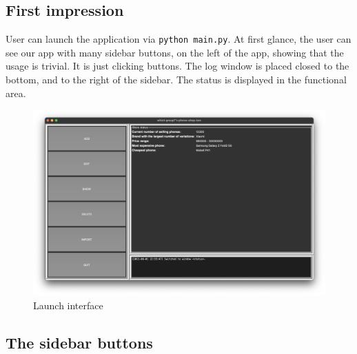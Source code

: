 \documentclass[12pt,oneside,a4paper]{article}
\begin{document}
\subsection{First impression}
User can launch the application via \verb|python main.py|. At first glance, the user can see our app with many sidebar buttons, on the left of the app, showing that the usage is trivial. It is just clicking buttons. The log window is placed closed to the bottom, and to the right of the sidebar. The status is displayed in the functional area.
\vspace{4cm}
\begin{figure}[H]
  \centerline{\includegraphics[scale=0.35]{launch-time.png}}
  \caption{Launch interface}
\end{figure}

\newpage

\subsection{The sidebar buttons}
\end{document}
